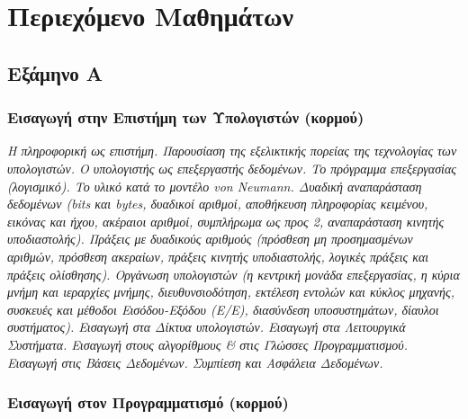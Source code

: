 \hypertarget{ux3c0ux3b5ux3c1ux3b9ux3b5ux3c7ux3ccux3bcux3b5ux3bdux3bf-ux3bcux3b1ux3b8ux3b7ux3bcux3acux3c4ux3c9ux3bd}{%
\section{Περιεχόμενο
Μαθημάτων}\label{ux3c0ux3b5ux3c1ux3b9ux3b5ux3c7ux3ccux3bcux3b5ux3bdux3bf-ux3bcux3b1ux3b8ux3b7ux3bcux3acux3c4ux3c9ux3bd}}

\hypertarget{ux3b5ux3beux3acux3bcux3b7ux3bdux3bf-ux3b1}{%
\subsection{Εξάμηνο Α}\label{ux3b5ux3beux3acux3bcux3b7ux3bdux3bf-ux3b1}}

\hypertarget{ux3b5ux3b9ux3c3ux3b1ux3b3ux3c9ux3b3ux3ae-ux3c3ux3c4ux3b7ux3bd-ux3b5ux3c0ux3b9ux3c3ux3c4ux3aeux3bcux3b7-ux3c4ux3c9ux3bd-ux3c5ux3c0ux3bfux3bbux3bfux3b3ux3b9ux3c3ux3c4ux3ceux3bd-ux3baux3bfux3c1ux3bcux3bfux3cd}{%
\subsubsection{Εισαγωγή στην Επιστήμη των Υπολογιστών
(κορμού)}\label{ux3b5ux3b9ux3c3ux3b1ux3b3ux3c9ux3b3ux3ae-ux3c3ux3c4ux3b7ux3bd-ux3b5ux3c0ux3b9ux3c3ux3c4ux3aeux3bcux3b7-ux3c4ux3c9ux3bd-ux3c5ux3c0ux3bfux3bbux3bfux3b3ux3b9ux3c3ux3c4ux3ceux3bd-ux3baux3bfux3c1ux3bcux3bfux3cd}}

\emph{Η πληροφορική ως επιστήμη. Παρουσίαση της εξελικτικής πορείας της
τεχνολογίας των υπολογιστών. Ο υπολογιστής ως επεξεργαστής δεδομένων. Το
πρόγραμμα επεξεργασίας (λογισμικό). Το υλικό κατά το μοντέλο von
Neumann. Δυαδική αναπαράσταση δεδομένων (bits και bytes, δυαδικοί
αριθμοί, αποθήκευση πληροφορίας κειμένου, εικόνας και ήχου, ακέραιοι
αριθμοί, συμπλήρωμα ως προς 2, αναπαράσταση κινητής υποδιαστολής).
Πράξεις με δυαδικούς αριθμούς (πρόσθεση μη προσημασμένων αριθμών,
πρόσθεση ακεραίων, πράξεις κινητής υποδιαστολής, λογικές πράξεις και
πράξεις ολίσθησης). Οργάνωση υπολογιστών (η κεντρική μονάδα
επεξεργασίας, η κύρια μνήμη και ιεραρχίες μνήμης, διευθυνσιοδότηση,
εκτέλεση εντολών και κύκλος μηχανής, συσκευές και μέθοδοι Εισόδου-Εξόδου
(Ε/Ε), διασύνδεση υποσυστημάτων, δίαυλοι συστήματος). Εισαγωγή στα
Δίκτυα υπολογιστών. Εισαγωγή στα Λειτουργικά Συστήματα. Εισαγωγή στους
αλγορίθμους \& στις Γλώσσες Προγραμματισμού. Εισαγωγή στις Βάσεις
Δεδομένων. Συμπίεση και Ασφάλεια Δεδομένων.}

\hypertarget{ux3b5ux3b9ux3c3ux3b1ux3b3ux3c9ux3b3ux3ae-ux3c3ux3c4ux3bfux3bd-ux3c0ux3c1ux3bfux3b3ux3c1ux3b1ux3bcux3bcux3b1ux3c4ux3b9ux3c3ux3bcux3cc-ux3baux3bfux3c1ux3bcux3bfux3cd}{%
\subsubsection{Εισαγωγή στον Προγραμματισμό
(κορμού)}\label{ux3b5ux3b9ux3c3ux3b1ux3b3ux3c9ux3b3ux3ae-ux3c3ux3c4ux3bfux3bd-ux3c0ux3c1ux3bfux3b3ux3c1ux3b1ux3bcux3bcux3b1ux3c4ux3b9ux3c3ux3bcux3cc-ux3baux3bfux3c1ux3bcux3bfux3cd}}

